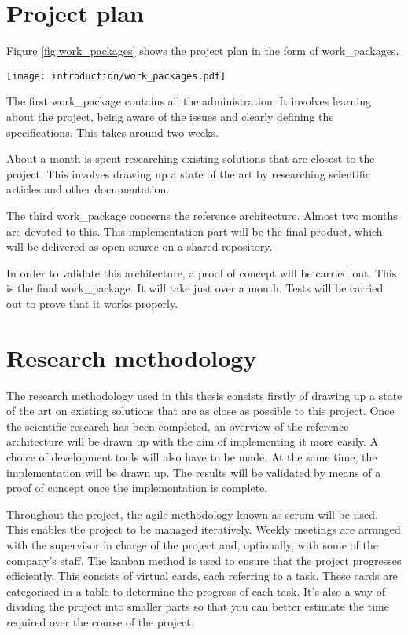 \section{Project plan}

Figure \ref{fig:work_packages} shows the project plan in the form of \glspl{work_package}.
\begin{center}
    \begingroup
    \texttt{[image: introduction/work\_packages.pdf]}
    \label{fig:work_packages}
    \endgroup
\end{center}
The first \gls{work_package} contains all the administration. It involves learning about the project, being aware of the issues and clearly defining the specifications. This takes around two weeks.

About a month is spent researching existing solutions that are closest to the project. This involves drawing up a state of the art by researching scientific articles and other documentation.

The third \gls{work_package} concerns the reference architecture. Almost two months are devoted to this. This implementation part will be the final product, which will be delivered as open source on a shared repository.

In order to validate this architecture, a proof of concept will be carried out. This is the final \gls{work_package}. It will take just over a month. Tests will be carried out to prove that it works properly.

\section{Research methodology}

The research methodology used in this thesis consists firstly of drawing up a state of the art on existing solutions that are as close as possible to this project. Once the scientific research has been completed, an overview of the reference architecture will be drawn up with the aim of implementing it more easily. A choice of development tools will also have to be made. At the same time, the implementation will be drawn up. The results will be validated by means of a proof of concept once the implementation is complete.

Throughout the project, the agile methodology known as \gls{scrum} will be used. This enables the project to be managed iteratively. Weekly meetings are arranged with the supervisor in charge of the project and, optionally, with some of the company's staff. The \gls{kanban} method is used to ensure that the project progresses efficiently. This consists of virtual cards, each referring to a task. These cards are categorised in a table to determine the progress of each task. It's also a way of dividing the project into smaller parts so that you can better estimate the time required over the course of the project.


